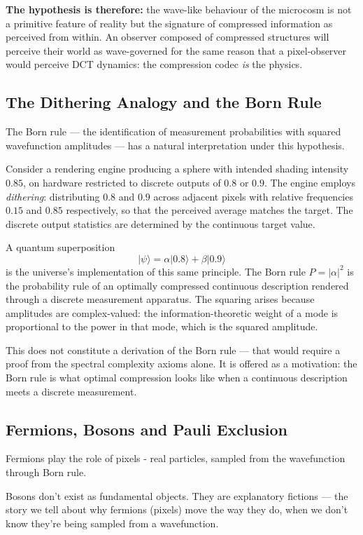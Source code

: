 \documentclass[11pt]{article}
\begin{document}
\textbf{The hypothesis is therefore:} the wave-like behaviour of the
microcosm is not a primitive feature of reality but the signature of
compressed information as perceived from within. An observer composed of
compressed structures will perceive their world as wave-governed for the
same reason that a pixel-observer would perceive DCT dynamics: the
compression codec \emph{is} the physics.

\subsection{The Dithering Analogy and the Born Rule}

The Born rule --- the identification of measurement probabilities with
squared wavefunction amplitudes --- has a natural interpretation under
this hypothesis.

Consider a rendering engine producing a sphere with intended shading
intensity $0.85$, on hardware restricted to discrete outputs of $0.8$ or
$0.9$. The engine employs \emph{dithering}: distributing $0.8$ and $0.9$
across adjacent pixels with relative frequencies $0.15$ and $0.85$
respectively, so that the perceived average matches the target. The
discrete output statistics are determined by the continuous target value.

A quantum superposition
\[
|\psi\rangle = \alpha|0.8\rangle + \beta|0.9\rangle
\]
is the universe's implementation of this same principle. The Born rule
$P = |\alpha|^2$ is the probability rule of an optimally compressed
continuous description rendered through a discrete measurement apparatus.
The squaring arises because amplitudes are complex-valued: the
information-theoretic weight of a mode is proportional to the power in
that mode, which is the squared amplitude.

This does not constitute a derivation of the Born rule --- that would
require a proof from the spectral complexity axioms alone. It is offered
as a motivation: the Born rule is what optimal compression looks like when
a continuous description meets a discrete measurement.


\subsection{Fermions, Bosons and Pauli Exclusion}

Fermions play the role of pixels - real particles, sampled from the wavefunction through Born rule.

Bosons don't exist as fundamental objects. They are explanatory fictions — the story we tell about
why fermions (pixels) move the way they do, when we don't know they're being sampled from a wavefunction.
\end{document}
